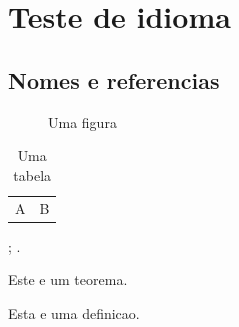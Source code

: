 \documentclass[pt, font = none, mode = simple]{elegantbook-l3}
\begin{document}
\frontmatter
\tableofcontents

\mainmatter
\chapter{Teste de idioma}
\section{Nomes e referencias}

\begin{figure}[htbp]
  \centering
  \fbox{\rule{0pt}{2cm}\rule{3cm}{0pt}}
  \caption{Uma figura}\label{fig:language-test}
\end{figure}

\begin{table}[htbp]
  \centering
  \caption{Uma tabela}\label{tab:language-test}
  \begin{tabular}{cc}
    A & B
  \end{tabular}
\end{table}

; .

\begin{theorem}[Exemplo]
  Este e um teorema.
\end{theorem}

\begin{definition}
  Esta e uma definicao.
\end{definition}
\end{document}
